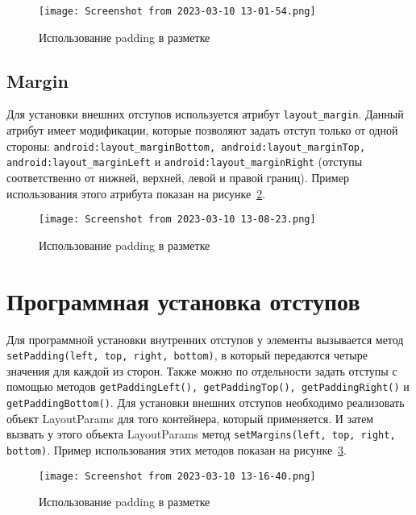 \begin{figure}[h!tp]
	\centering
	\texttt{[image: Screenshot from 2023-03-10 13-01-54.png]}
	\caption{Использование padding в разметке}
	\label{fig:xml:padding}
\end{figure}

\subsection{Margin}
Для установки внешних отступов используется атрибут \texttt{layout\_margin}.
Данный атрибут имеет модификации, которые позволяют задать отступ
только от одной стороны: \texttt{android:layout\_marginBottom,
android:layout\_marginTop, android:layout\_marginLeft} и
\texttt{android:layout\_marginRight} (отступы соответственно от нижней,
верхней, левой и правой границ).
Пример использования этого атрибута показан на рисунке~\ref{fig:xml:margin}.

\begin{figure}[h!tp]
	\centering
	\texttt{[image: Screenshot from 2023-03-10 13-08-23.png]}
	\caption{Использование padding в разметке}
	\label{fig:xml:margin}
\end{figure}

\section{Программная установка отступов}
Для программной установки внутренних отступов у элементы вызывается
метод \texttt{setPadding(left, top, right, bottom)},
в который передаются четыре значения для каждой из сторон.
Также можно по отдельности задать отступы с помощью методов
\texttt{getPaddingLeft(), getPaddingTop(), getPaddingRight()} и
\texttt{getPaddingBottom()}.
Для установки внешних отступов необходимо реализовать объект
LayoutParams для того контейнера, который применяется.
И затем вызвать у этого объекта LayoutParams метод
\texttt{setMargins(left, top, right, bottom)}.
Пример использования этих методов показан на рисунке~\ref{fig:java:pd:mrg}.

\begin{figure}[h!tp]
	\centering
	\texttt{[image: Screenshot from 2023-03-10 13-16-40.png]}
	\caption{Использование padding в разметке}
	\label{fig:java:pd:mrg}
\end{figure}

